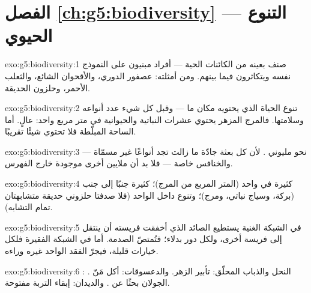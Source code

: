 \section*{الفصل \ref{ch:g5:biodiversity} --- التنوع الحيوي}

\begin{solution}{exo:g5:biodiversity:1}
صنف بعينه من الكائنات الحية --- أفراد مبنيون على النموذج نفسه
ويتكاثرون فيما بينهم. ومن أمثلته: عصفور الدوري، والأقحوان الشائع،
والثعلب الأحمر، وحلزون الحديقة.
\end{solution}

\begin{solution}{exo:g5:biodiversity:2}
تنوع الحياة الذي يحتويه مكان ما --- وقبل كل شيء عدد أنواعه
وسلامتها. فالمرج المزهر يحتوي عشرات  النباتية والحيوانية في
متر مربع واحد:  عالٍ. أما الساحة المبلّطة فلا تحتوي شيئًا
تقريبًا.
\end{solution}

\begin{solution}{exo:g5:biodiversity:3}
نحو مليوني . لأن كل بعثة جادّة ما زالت تجد أنواعًا غير مسمّاة
--- والخنافس خاصة --- فلا بد أن ملايين أخرى موجودة خارج الفهرس.
\end{solution}

\begin{solution}{exo:g5:biodiversity:4}
 كثيرة في  واحد (المتر المربع من المرج)؛  كثيرة
جنبًا إلى جنب (بركة، وسياج نباتي، ومرج)؛ وتنوع داخل  الواحد
(فلا صدفتا حلزوني حديقة متشابهتان تمام التشابه).
\end{solution}

\begin{solution}{exo:g5:biodiversity:5}
في الشبكة الغنية يستطيع الصائد الذي أخفقت فريسته أن ينتقل إلى
فريسة أخرى، ولكل دور بدلاء؛ فتُمتصّ الصدمة. أما في الشبكة الفقيرة
فلكل  خيارات قليلة، فيجرّ الفقد الواحد غيره وراءه.
\end{solution}

\begin{solution}{exo:g5:biodiversity:6}
النحل والذباب المحلّق: تأبير الزهر. والدعسوقات: أكل مَنّ .
: الجولان بحثًا عن . والديدان: إبقاء التربة مفتوحة.
\end{solution}

